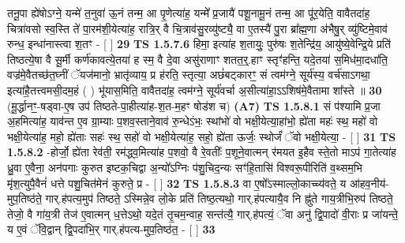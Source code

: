\documentclass[17pt]{extarticle}
\begin{document}
                  तनू॒पा ह्ये॑षोऽग्ने॒ यन्मे॑ त॒नुवा॑ ऊ॒नं तन्म॒ आ पृ॒णेत्या॑ह॒ यन्मे᳚ प्र॒जायै॑ पशू॒नामू॒नं तन्म॒ आ पू॑र॒येति॒ वावैतदा॑ह॒ चित्रा॑वसो स्व॒स्ति ते॑ पा॒रम॑शी॒येत्या॑ह॒ रात्रि॒र् वै चि॒त्राव॑सु॒रव्यु॑ष्ट्यै॒ वा ए॒तस्यै॑ पु॒रा ब्रा᳚ह्म॒णा अ॑भैषु॒र् व्यु॑ष्टिमे॒वाव॑ रुन्ध॒ इन्धा॑नास्त्वा श॒तꣳ - [ ] \textbf{  29} \newline
                  \newline
                                \textbf{ TS 1.5.7.6} \newline
                  हिमा॒ इत्या॑ह श॒तायुः॒ पुरु॑षः श॒तेन्द्रि॑य॒ आयु॑ष्ये॒वेन्द्रि॒ये प्रति॑ तिष्ठत्ये॒षा वै सू॒र्मी कर्ण॑कावत्ये॒तया॑ ह स्म॒ वै दे॒वा असु॑राणाꣳ शतत॒र्॒.हाꣳ स्तृꣳ॑हन्ति॒ यदे॒तया॑ स॒मिध॑मा॒दधा॑ति॒ वज्र॑मे॒वैतच्छ॑त॒घ्नीं ॅयज॑मानो॒ भ्रातृ॑व्याय॒ प्र ह॑रति॒ स्तृत्या॒ अछं॑बट्कारꣳ॒॒ सं त्वम॑ग्ने॒ सूर्य॑स्य॒ वर्च॑साऽगथा॒ इत्या॑है॒तत्त्वमसी॒दम॒हं ( ) भू॑यास॒मिति॒ वावैतदा॑ह॒ त्वम॑ग्ने॒ सूर्य॑वर्चा अ॒सीत्या॑हा॒ऽऽशिष॑मे॒वैतामा शा᳚स्ते ॥ \textbf{  30 } \newline
                  \newline
                      (मू॒र्द्धानꣳ॒॒-षड्वा-ए॒ष उप॑ तिष्ठते-पा॒हीत्या॑ह-श॒त-म॒हꣳ षोड॑श च)  \textbf{(A7)} \newline \newline
                                        \textbf{ TS 1.5.8.1} \newline
                  सं प॑श्यामि प्र॒जा अ॒हमित्या॑ह॒ याव॑न्त ए॒व ग्रा॒म्याः प॒शव॒स्ताने॒वाव॑ रु॒न्धेऽंभः॒ स्थांभो॑ वो भक्षी॒येत्या॒हांभो॒ ह्ये॑ता महः॑ स्थ॒ महो॑ वो भक्षी॒येत्या॑ह॒ महो॒ ह्ये॑ताः सहः॑ स्थ॒ सहो॑ वो भक्षी॒येत्या॑ह॒ सहो॒ ह्ये॑ता ऊर्जः॒ स्थोर्जं॑ ॅवो भक्षी॒येत्या॒ - [ ] \textbf{  31} \newline
                  \newline
                                \textbf{ TS 1.5.8.2} \newline
                  -होर्जो॒ ह्ये॑ता रेव॑ती॒ रम॑द्ध्व॒मित्या॑ह प॒शवो॒ वै रे॒वतीः᳚ प॒शूने॒वात्मन् र॑मयत इ॒हैव स्ते॒तो माऽप॑ गा॒तेत्या॑ह ध्रु॒वा ए॒वैना॒ अन॑पगाः कुरुत इष्टक॒चिद्वा अ॒न्यो᳚ऽग्निः प॑शु॒चिद॒न्यः सꣳ॑हि॒तासि॑ विश्वरू॒पीरिति॑ व॒थ्सम॒भि मृ॑श॒त्युपै॒वैनं॑ धत्ते पशु॒चित॑मेनं कुरुते॒ प्र - [ ] \textbf{  32} \newline
                  \newline
                                \textbf{ TS 1.5.8.3} \newline
                  वा ए॒षो᳚ऽस्माल्लो॒काच्च्य॑वते॒ य आ॑हव॒नीय॑-मुप॒तिष्ठ॑ते॒ गार्.ह॑पत्य॒मुप॑ तिष्ठते॒ ऽस्मिन्ने॒व लो॒के प्रति॑ तिष्ठ॒त्यथो॒ गार्.ह॑पत्यायै॒व नि ह्नु॑ते गाय॒त्रीभि॒रुप॑ तिष्ठते॒ तेजो॒ वै गा॑य॒त्री तेज॑ ए॒वात्मन् ध॒त्तेऽथो॒ यदे॒तं तृ॒चम॒न्वाह॒ सन्त॑त्यै॒ गार्.ह॑पत्यं॒ ॅवा अनु॑ द्वि॒पादो॑ वी॒राः प्र जा॑यन्ते॒ य ए॒वं ॅवि॒द्वान् द्वि॒पदा॑भि॒र् गार्.ह॑पत्य-मुप॒तिष्ठ॑त॒ - [ ] \textbf{  33} \newline
\end{document}
